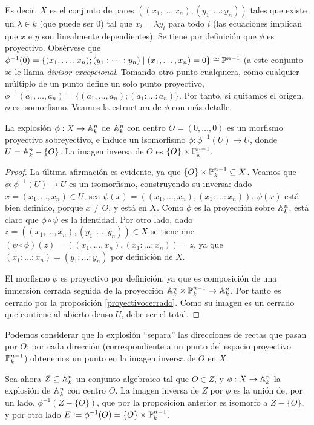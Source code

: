 \documentclass[ACGA.tex]{subfiles}
\begin{document}
Es decir, $X$ es el conjunto de pares $((x_1,\ldots,x_n),(y_1:\ldots:y_n))$ tales que existe un $\lambda\in k$ (que puede ser $0$) tal que $x_i=\lambda y_i$ para todo $i$ (las ecuaciones implican que $x$ e $y$ son linealmente dependientes). Se tiene por definición que $\phi$ es proyectivo. Obsérvese que $\phi^{-1}(0)=\{(x_1,\dots, x_n);(y_1:\dots:y_n)\mid (x_1,\dots,x_n)=0\}\cong\mathbb{P}^{n-1}$ (a este conjunto se le llama \emph{divisor excepcional}. Tomando otro punto cualquiera, como cualquier múltiplo de un punto define un solo punto proyectivo, $\phi^{-1}(a_1,\dots,a_n)=\{(a_1,\dots,a_n);(a_1:\dots:a_n)\}$. Por tanto, si quitamos el origen, $\phi$ es isomorfismo. Veamos la estructura de $\phi$ con más detalle.

\begin{prop}
 La explosión $\phi:X\to\mathbb{A}^n_k$ de $\mathbb{A}^n_k$ con centro $O=(0,\ldots,0)$ es un morfismo proyectivo sobreyectivo, e induce un isomorfismo $\phi:\phi^{-1}(U)\to U$, donde $U=\mathbb{A}^n_k-\{O\}$. La imagen inversa de $O$ es $\{O\}\times\mathbb{P}^{n-1}_k$.
\end{prop}

\begin{proof}
 La última afirmación es evidente, ya que $\{O\}\times\mathbb{P}^{n-1}_k\subseteq X$. Veamos que $\phi:\phi^{-1}(U)\to U$ es un isomorfismo, construyendo su inversa: dado $x=(x_1,\ldots,x_n)\in U$, sea $\psi(x)=((x_1,\ldots,x_n),(x_1:\ldots:x_n))$. $\psi(x)$ está bien definido, porque $x\neq O$, y está en $X$. 
 Como $\phi$ es la proyección sobre $\mathbb{A}^n_k$, está claro que $\phi\circ\psi$ es la identidad. Por otro lado, dado $z=((x_1,\ldots,x_n),(y_1:\ldots:y_n))\in X$ se tiene que $(\psi\circ\phi)(z)=((x_1,\ldots,x_n),(x_1:\ldots:x_n))=z$, ya que $(x_1:\ldots:x_n)=(y_1:\ldots:y_n)$ por definición de $X$.

El morfismo $\phi$ es proyectivo por definición, ya que es composición de una inmersión cerrada seguida de la proyección $\mathbb{A}^n_k\times\mathbb{P}^{n-1}_k\to\mathbb{A}^n_k$. Por tanto es cerrado por la proposición \ref{proyectivocerrado}. Como su imagen es un cerrado que contiene al abierto denso $U$, debe ser el total. 
\end{proof}

Podemos considerar que la explosión ``separa'' las direcciones de rectas que pasan por $O$: por cada dirección (correspondiente a un punto del espacio proyectivo $\mathbb{P}^{n-1}_k$) obtenemos un punto en la imagen inversa de $O$ en $X$.

Sea ahora $Z\subseteq\mathbb{A}^n_k$ un conjunto algebraico tal que $O\in Z$, y $\phi:X\to\mathbb{A}^n_k$ la explosión de $\mathbb{A}^n_k$ con centro $O$. La imagen inversa de $Z$ por $\phi$ es la unión de, por un lado, $\phi^{-1}(Z-\{O\})$, que por la proposición anterior es isomorfo a $Z-\{O\}$, y por otro lado $E:=\phi^{-1}(O)=\{O\}\times\mathbb{P}^{n-1}_k$. 
\end{document}
